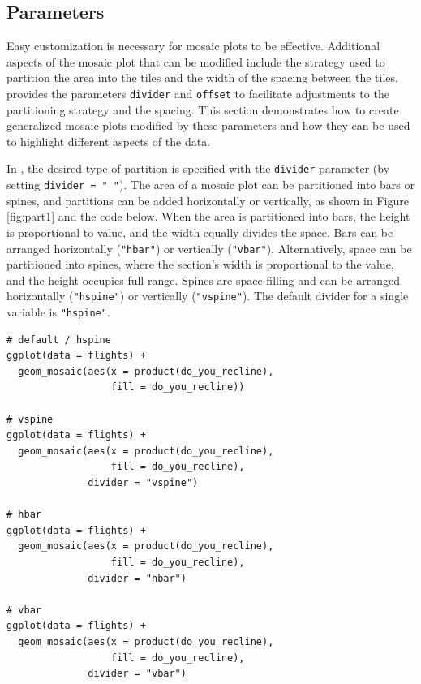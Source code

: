 \hypertarget{parameters}{%
\subsection*{Parameters}\label{parameters}}

Easy customization is necessary for mosaic plots to be effective. Additional aspects of the mosaic plot that can be modified include the strategy used to partition the area into the tiles and the width of the spacing between the tiles.  provides the parameters \texttt{divider} and \texttt{offset} to facilitate adjustments to the partitioning strategy and the spacing. This section demonstrates how to create generalized mosaic plots modified by these parameters and how they can be used to highlight different aspects of the data.

In , the desired type of partition is specified with the \texttt{divider} parameter (by setting \texttt{divider\ =\ "\ "}). The area of a mosaic plot can be partitioned into bars or spines, and partitions can be added horizontally or vertically, as shown in Figure \ref{fig:part1} and the code below. When the area is partitioned into bars, the height is proportional to value, and the width equally divides the space. Bars can be arranged horizontally (\texttt{"hbar"}) or vertically (\texttt{"vbar"}). Alternatively, space can be partitioned into spines, where the section's width is proportional to the value, and the height occupies full range. Spines are space-filling and can be arranged horizontally (\texttt{"hspine"}) or vertically (\texttt{"vspine"}). The default divider for a single variable is \texttt{"hspine"}.

\begin{verbatim}
# default / hspine
ggplot(data = flights) + 
  geom_mosaic(aes(x = product(do_you_recline), 
                  fill = do_you_recline))

# vspine
ggplot(data = flights) + 
  geom_mosaic(aes(x = product(do_you_recline), 
                  fill = do_you_recline), 
              divider = "vspine") 

# hbar
ggplot(data = flights) + 
  geom_mosaic(aes(x = product(do_you_recline), 
                  fill = do_you_recline), 
              divider = "hbar") 

# vbar
ggplot(data = flights) + 
  geom_mosaic(aes(x = product(do_you_recline), 
                  fill = do_you_recline), 
              divider = "vbar") 
\end{verbatim}

